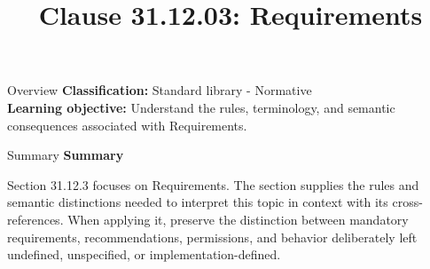 \documentclass[10pt,letterpaper]{article}
\title{Clause 31.12.03: Requirements}
\author{}
\date{}
\begin{document}
\maketitle
\begin{CornellOverviewBox}{Overview}
\textbf{Classification:} Standard library - Normative\\[2pt]
\textbf{Learning objective:} Understand the rules, terminology, and semantic consequences associated with Requirements.
\end{CornellOverviewBox}\begin{CornellSummaryBox}{Summary}
{\sffamily\bfseries\color{Accent} Summary}\par\vspace{3pt}Section 31.12.3 focuses on Requirements. The section supplies the rules and semantic distinctions needed to interpret this topic in context with its cross-references. When applying it, preserve the distinction between mandatory requirements, recommendations, permissions, and behavior deliberately left undefined, unspecified, or implementation-defined.
\end{CornellSummaryBox}
\end{document}
